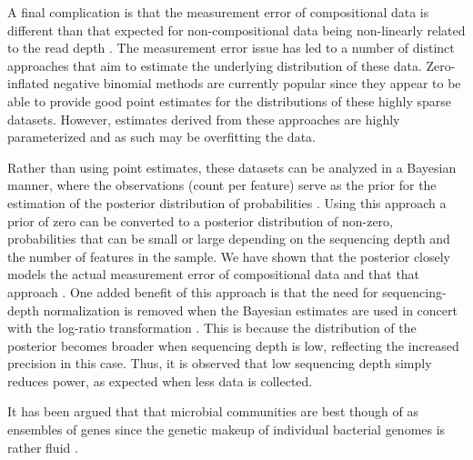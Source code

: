\documentclass[10pt,letterpaper]{article}
\begin{document}
A final complication is that the measurement error of compositional data is different than that expected for non-compositional data being non-linearly related to the read depth \cite{fernandes:2013}. The measurement error issue has led to a number of distinct approaches that aim to estimate the underlying distribution of these data. Zero-inflated negative binomial methods are currently popular since they appear to be able to provide good point estimates for the distributions of these highly sparse datasets. However, estimates derived from these approaches are highly parameterized and as such may be overfitting the data.

Rather than using point estimates, these datasets can be analyzed in a Bayesian manner, where the observations (count per feature) serve as the prior for the estimation of the posterior distribution of probabilities \cite{fernandes:2013,fernandes:2014, gloorAJS:2016}. Using this approach a prior of zero can be converted to a posterior distribution of non-zero, probabilities that can be small or large depending on the sequencing depth and the number of features in the sample. We have shown that the posterior closely models the actual measurement error of compositional data and that that approach \cite{fernandes:2013, gloorAJS:2016}. One added benefit of this approach is that the need for sequencing-depth normalization is removed when the Bayesian estimates are used in concert with the log-ratio transformation \cite{fernandes:2013, Lovell:2015}. This is because the distribution of the posterior becomes broader when sequencing depth is low, reflecting the increased precision in this case. Thus, it is observed that low sequencing depth simply reduces power,  as expected when less data is collected. 



It has been argued that that microbial communities are best though of as ensembles of genes since the genetic makeup of individual bacterial genomes is rather fluid \cite{boon:2014}. 

\end{document}
